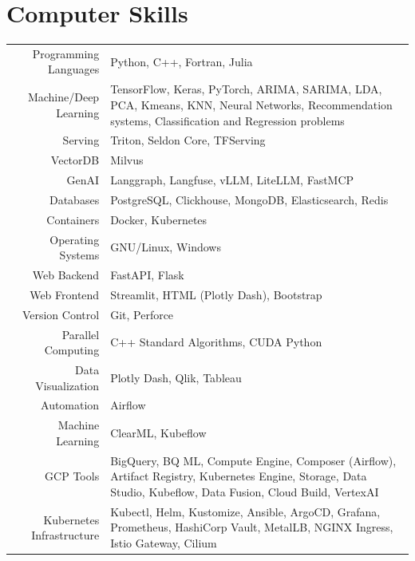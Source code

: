 \documentclass[a4paper,10pt]{article} %
\begin{document}
\section{Computer Skills}
\bigskip
\begin{tabular}{r|p{10.5cm}}
	Programming Languages & Python, C++, Fortran, Julia \\
	Machine/Deep Learning & TensorFlow, Keras, PyTorch, ARIMA, SARIMA, LDA, PCA, Kmeans, KNN, Neural Networks, Recommendation systems, Classification and Regression problems\\
	Serving & Triton, Seldon Core, TFServing \\
	VectorDB & Milvus \\
    GenAI & Langgraph, Langfuse, vLLM, LiteLLM, FastMCP \\
	Databases & PostgreSQL, Clickhouse, MongoDB, Elasticsearch, Redis \\
	Containers & Docker, Kubernetes \\
	Operating Systems & GNU/Linux, Windows \\
	Web Backend & FastAPI, Flask \\
	Web Frontend & Streamlit, HTML (Plotly Dash), Bootstrap \\
	Version Control & Git, Perforce \\
	Parallel Computing & C++ Standard Algorithms, CUDA Python\\
	Data Visualization & Plotly Dash, Qlik, Tableau \\
 	Automation & Airflow \\
  	Machine Learning & ClearML, Kubeflow \\
	GCP Tools & BigQuery, BQ ML, Compute Engine, Composer (Airflow), Artifact Registry, Kubernetes Engine, Storage, Data Studio, Kubeflow, Data Fusion, Cloud Build, VertexAI \\
	Kubernetes Infrastructure & Kubectl, Helm, Kustomize, Ansible, ArgoCD, Grafana, Prometheus, HashiCorp Vault, MetalLB, NGINX Ingress, Istio Gateway, Cilium\\
\end{tabular}
\bigskip

\bigskip
\end{document}
